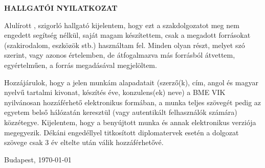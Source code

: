 \begin{center}
\large
\textbf{HALLGATÓI NYILATKOZAT}\\
\end{center}

Alulírott \emph{\vikszerzo}, szigorló hallgató kijelentem,
hogy ezt a szakdolgozatot meg nem engedett segítség nélkül,
saját magam készítettem, csak a megadott forrásokat
(szakirodalom, eszközök stb.) használtam fel.
Minden olyan részt, melyet szó szerint, vagy azonos értelemben,
de átfogalmazva más forrásból átvettem, egyértelműen,
a forrás megadásával megjelöltem.

Hozzájárulok, hogy a jelen munkám alapadatait (szerző(k), cím, angol és
magyar nyelvű tartalmi kivonat, készítés éve, konzulens(ek) neve) a BME VIK
nyilvánosan hozzáférhető elektronikus formában,
a munka teljes szövegét pedig az egyetem belső hálózatán keresztül
(vagy autentikált felhasználók számára) közzétegye. Kijelentem, hogy a
benyújtott munka és annak elektronikus verziója megegyezik.
Dékáni engedéllyel titkosított diplomatervek esetén a dolgozat szövege
csak 3 év eltelte után válik hozzáférhetővé.

\begin{flushleft}
\vspace*{1cm}
Budapest, \today
\end{flushleft}

\begin{flushright}
 \vspace*{1cm}
 \makebox[7cm]{\rule{6cm}{.4pt}}\\
 \makebox[7cm]{\emph{\vikszerzo}}\\
\end{flushright}
\thispagestyle{empty}

\vfill
\clearpage
\thispagestyle{empty} %
